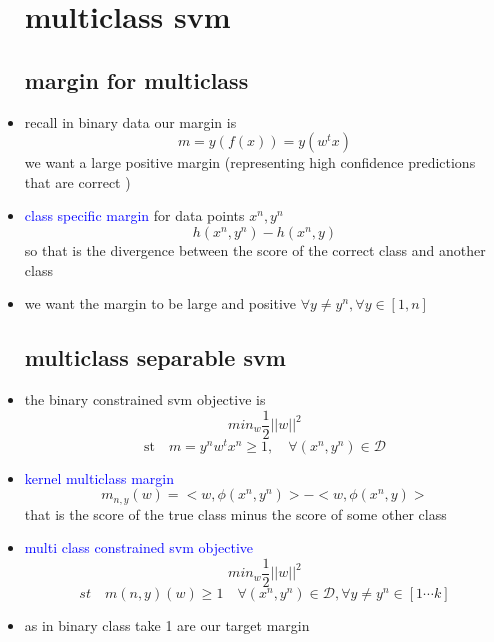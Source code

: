 \documentclass{article}
\begin{document}
\begin{itemize}
\section{multiclass svm}
\subsection*{margin for multiclass}
\item recall in binary data our margin is $$m=y(f(x))=y(w^{t}x)$$ we want a large positive margin (representing high confidence predictions that are correct )
\item \textcolor{blue}{class specific margin} for data points $x^{n},y^{n}$ $$h(x^n,y^n)-h(x^n,y)$$ so that is the divergence between the score of the correct class and another class 
\item we want the margin to be large and positive $\forall y\neq y^{n}, \forall y\in [1,n]$ 
\subsection*{multiclass separable svm}
\item the binary constrained svm objective is $$min_{w}\frac{1}{2}||w||^{2}$$ $$\text{st}\quad m=y^{n}w^{t}x^{n}\geq 1, \quad \forall(x^n,y^n)\in \mathcal{D}$$
\item \textcolor{blue}{kernel multiclass margin }$$m_{n,y}(w)=<w,\phi(x^{n},y^{n})>-<w,\phi(x^{n},y)>$$ that is the score of the true class minus the score of some other class 
\item \textcolor{blue}{multi class constrained svm objective} $$min_{w}\frac{1}{2}||w||^{2}$$ $$st\quad m(n,y)(w)\geq 1 \quad \forall (x^{n},y^n)\in \mathcal{D}, \forall y\neq y^{n}\in [1\cdots k]$$
\item as in binary class take 1 are our target margin 

\end{itemize}
\end{document}
